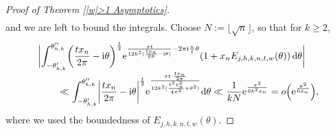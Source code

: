 \begin{proof}[Proof of Theorem \ref{|w|>1 Asymptotics}]
\begin{align}
 \end{align}
and we are left to bound the integrals. Choose $N:=\lfloor \sqrt{n} \rfloor$, so that for $k \geq 2$,{\samepage
\begin{align*}
 & \biggl|
 \int_{-\theta_{h,k}'}^{\theta_{h,k}''} \biggl(\frac{tx_n}{2\pi}-{\rm i}\theta\biggr)^{\frac{t}{2}}{\rm e}^{\frac{\pi t}{12k^2(\frac{tx_n}{2\pi}-{\rm i}\theta)}-2\pi {\rm i} \frac{n}{t} \theta} (1+x_n E_{j,h,k,n,t,w}(\theta)) \,{\rm d}\theta \biggr| \\[-1mm]
 &\qquad{} \ll \int_{-\theta_{h,k}'}^{\theta_{h,k}''} \biggl|\frac{tx_n}{2\pi}-{\rm i}\theta \biggr|^{\frac{t}{2}} {\rm e}^{\frac{\pi t \cdot \frac{tx_n}{2\pi}}{12k^2(\frac{t^2x_n^2}{4\pi^2}+\theta^2)}} {\rm d}\theta
 \ll \frac{1}{kN}{\rm e}^{\frac{\pi^2}{6k^2x_n}}
 =o\Bigl({\rm e}^{\frac{\pi^2}{6x_n}}\Bigr),
\end{align*}
where we used the boundedness of $E_{j,h,k,n,t,w}(\theta)$.}


\end{proof}
